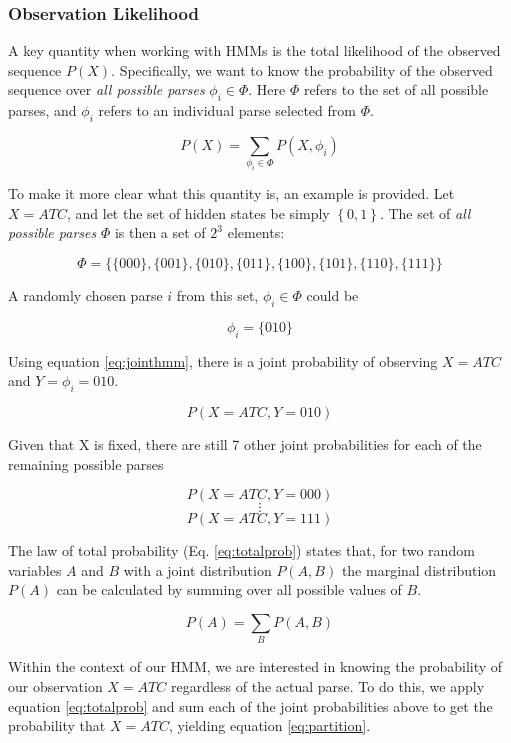 \subsubsection{Observation Likelihood}
A key quantity when working with HMMs is the total likelihood of the observed sequence $P(X)$. Specifically, we want to know the probability of the observed sequence over \emph{all possible parses} $\phi_i \in \Phi$. Here $\Phi$ refers to the set of all possible parses, and $\phi_i$ refers to an individual parse selected from $\Phi$. 

\begin{equation}
 P(X) = \sum_{\phi_i \in \Phi}{P(X,\phi_i)}  
\label{eq:partition}
\end{equation}

To make it more clear what this quantity is, an example is provided. Let $X = ATC$, and let the set of hidden states be simply $\left\{0,1\right\}$. The set of \emph{all possible parses} $\Phi$ is then a set of $2^3$ elements:

$$\Phi = \{\{000\},\{001\},\{010\},\{011\},\{100\},\{101\},\{110\},\{111\}\}$$

A randomly chosen parse $i$ from this set, $\phi_i \in \Phi$ could be

$$\phi_i = \{010\}$$

Using equation \ref{eq:jointhmm}, there is a joint probability of observing $X=ATC$ and $Y = \phi_i = 010$.

$$P(X=ATC,Y=010)$$

Given that X is fixed, there are still 7 other joint probabilities for each of the remaining possible parses

$$P(X=ATC,Y=000)$$
$$\vdots$$
$$P(X=ATC,Y=111)$$

The law of total probability (Eq. \ref{eq:totalprob}) states that, for two random variables $A$ and $B$ with a joint distribution $P(A,B)$ the marginal distribution $P(A)$ can be calculated by summing over all possible values of $B$.

\begin{equation}
    P(A) = \sum_B{P(A,B)}
\label{eq:totalprob}
\end{equation}

Within the context of our HMM, we are interested in knowing the probability of our observation $X=ATC$ regardless of the actual parse. To do this, we apply equation \ref{eq:totalprob} and sum each of the joint probabilities above to get the probability that $X=ATC$, yielding equation \ref{eq:partition}.

